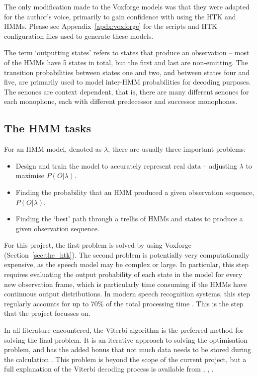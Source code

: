 	The only modification made to the Voxforge models was that they were adapted for the author's voice, primarily to gain confidence with using the HTK and HMMs.  Please see Appendix~\ref{apdx:voxforge} for the scripts and HTK configuration files used to generate these models.

	The term `outputting states' refers to states that produce an observation -- most of the HMMs have 5 states in total, but the first and last are non-emitting.  The transition probabilities between states one and two, and between states four and five, are primarily used to model inter-HMM probabilities for decoding purposes.  The senones are context dependent, that is, there are many different senones for each monophone, each with different predecessor and successor monophones.

	\subsection{The HMM tasks} %
	\label{sub:the_hmm_tasks}
		For an HMM model, denoted as $\lambda$, there are usually three important problems: 
		\begin{itemize}
			\item Design and train the model to accurately represent real data -- adjusting $\lambda$ to maximise $P(O | \lambda)$.
			\item Finding the probability that an HMM produced a given observation sequence, $P(O | \lambda)$.
			\item Finding the `best' path through a trellis of HMMs and states to produce a given observation sequence.
		\end{itemize}
		For this project, the first problem is solved by using Voxforge (Section~\ref{sec:the_htk}).  The second problem is potentially very computationally expensive, as the speech model may be complex or large.  In particular, this step requires evaluating the output probability of each state in the model for every new observation frame, which is particularly time consuming if the HMMs have continuous output distributions.  In modern speech recognition systems, this step regularly accounts for up to 70\% of the total processing time \cite{lai2002performance}.  This is the step that the project focusses on.

		In all literature encountered, the Viterbi algorithm is the preferred method for solving the final problem.  It is an iterative approach to solving the optimisation problem, and has the added bonus that not much data needs to be stored during the calculation \cite{schuster2006speech}.  This problem is beyond the scope of the current project, but a full explanation of the Viterbi decoding process is available from \cite{rabiner1989tutorial}, \cite{saeed2008advanced}, \cite{young1989token}.

